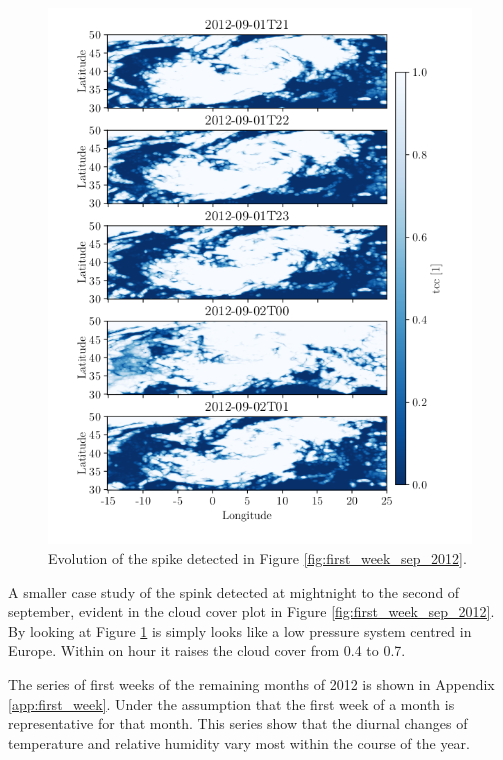 \begin{figure}
    \centering
    \includegraphics{python_figs/timelapse_tcc_spike_09_2012.png}
    \caption{Evolution of the spike detected in Figure \ref{fig:first_week_sep_2012}.}
    \label{fig:spike_sep_2012}
\end{figure}

A smaller case study of the spink detected at mightnight to the second of september, evident in the cloud cover plot in Figure \ref{fig:first_week_sep_2012}. By looking at Figure \ref{fig:spike_sep_2012} is simply looks like a low pressure system centred in Europe. Within on hour it raises the cloud cover from 0.4 to 0.7.  

The series of first weeks of the remaining months of 2012 is shown in Appendix \ref{app:first_week}. Under the assumption that the first week of a month is representative for that month. This series show that the diurnal changes of temperature and relative humidity vary most within the course of the year. 

